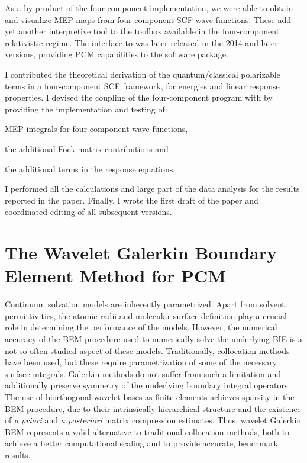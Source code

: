 As a by-product of the four-component implementation, we were able to obtain and visualize \acrshort{MEP} maps
from four-component \acrshort{SCF} wave functions. These add yet another interpretive tool to the toolbox available
in the four-component relativistic regime.
The interface to \DIRAC was later released in the 2014 and later versions,
providing \acrshort{PCM} capabilities to the software package.

I contributed the theoretical derivation of the quantum/classical polarizable
terms in a four-component \acrshort{SCF} framework, for energies and linear response
properties. I devised the coupling of the four-component program \DIRAC with
\pcmsolver by providing the implementation and testing of:
\begin{enumerate*}[label={\alph*)},font={\color{PMS1797}}]
  \item \acrshort{MEP} integrals for four-component wave functions,
  \item the additional Fock matrix contributions and
  \item the additional terms in the response equations.
\end{enumerate*}
I performed all the calculations and large part of the data analysis
for the results reported in the paper.
Finally, I wrote the first draft of the paper and coordinated editing of
all subsequent versions.

\section{The Wavelet Galerkin Boundary Element Method for PCM}\label{sec:wemlin}

Continuum solvation models are inherently parametrized. Apart from solvent permittivities,
the atomic radii and molecular surface definition play a crucial role
in determining the performance of the models.
However, the numerical accuracy of the \acrshort{BEM} procedure used to numerically solve the
underlying \acrshort{BIE} is a not-so-often studied aspect of these models.
Traditionally, collocation methods have been used, but these require parametrization of some of the necessary surface integrals.
Galerkin methods do not suffer from such a limitation and additionally preserve symmetry of the underlying
boundary integral operators.
The use of biorthogonal wavelet bases as finite elements achieves sparsity in
the \acrshort{BEM} procedure, due to their intrinsically hierarchical structure and
the existence of \emph{a priori} and \emph{a posteriori} matrix compression
estimates.
Thus, wavelet Galerkin \acrshort{BEM} represents a valid alternative to traditional
collocation methods, both to achieve a better computational scaling and to
provide accurate, benchmark results.\autocite{Harbrecht2004-uo,
Harbrecht2006-ug, Dahmen2006-pj}

